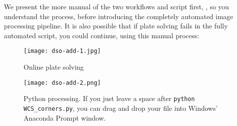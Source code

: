 We present the more manual of the two workflows and script first,
, so you understand the process, before
introducing the completely automated image processing pipeline. It is
also possible that if plate solving fails in the fully automated
script, you could continue, using this  manual process:

\begin{figure}[htbp]
\centering\texttt{[image: dso-add-1.jpg]}
\caption{Online plate solving}
\label{fig:dso:adding_images:manual:plate-solving}
\end{figure}
\begin{figure}[htbp]
\centering\texttt{[image: dso-add-2.png]}
\caption{Python processing. If you just leave a space after \texttt{python WCS\_corners.py},
you can drag and drop your  file into Windows' Anaconda Prompt window.}
\label{fig:dso:adding_images:manual:python}
\end{figure}

